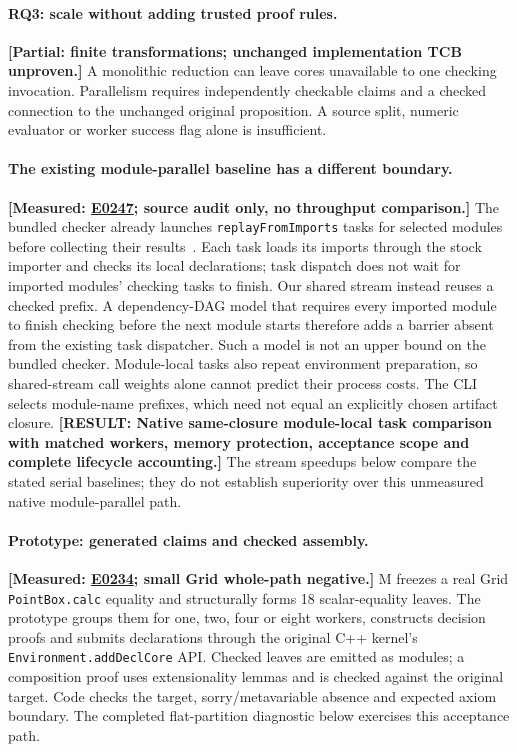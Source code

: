 \documentclass[10pt,twocolumn]{article}
\newcommand{\missing}[1]{\textbf{[RESULT: #1]}}
\newcommand{\measured}[1]{\textbf{[Measured: #1]}}
\newcommand{\partialev}[1]{\textbf{[Partial: #1]}}
\newcommand{\expref}[2]{\href{https://github.com/yunwei37/proofserve/blob/main/docs/tmp/build-and-evaluate/step-#1/step-report.md}{E#2}}
\begin{document}
\paragraph{RQ3: scale without adding trusted proof rules.}
\partialev{finite transformations; unchanged implementation TCB unproven.}
A monolithic reduction can leave cores unavailable to one checking invocation.
Parallelism requires independently checkable claims and a checked connection
to the unchanged original proposition.
A source split, numeric evaluator or worker success flag alone is insufficient.

\paragraph{The existing module-parallel baseline has a different boundary.}
\measured{\expref{0247-20261101T131749+0000}{0247}; source audit only, no throughput comparison.}
The bundled checker already launches \texttt{replayFromImports} tasks for
selected modules before collecting their results~\cite{lean434CheckerSource2026}.
Each task loads its imports through the stock importer and checks its local
declarations; task dispatch does not wait for imported modules' checking
tasks to finish.
Our shared stream instead reuses a checked prefix.
A dependency-DAG model that requires every imported module to finish checking
before the next module starts therefore adds a barrier absent from the
existing task dispatcher.
Such a model is not an upper bound on the bundled checker.
Module-local tasks also repeat environment preparation, so shared-stream
call weights alone cannot predict their process costs.
The CLI selects module-name prefixes, which need not equal an explicitly
chosen artifact closure.
\missing{Native same-closure module-local task comparison with matched workers,
memory protection, acceptance scope and complete lifecycle accounting.}
The stream speedups below compare the stated serial baselines; they do not
establish superiority over this unmeasured native module-parallel path.

\paragraph{Prototype: generated claims and checked assembly.}
\measured{\expref{0234-20261101T030854+0000}{0234}; small Grid whole-path negative.}
M freezes a real Grid \texttt{PointBox.calc} equality and structurally forms
18 scalar-equality leaves.
The prototype groups them for one, two, four or eight workers, constructs
decision proofs and submits declarations through the original C++ kernel's
\texttt{Environment.addDeclCore} API.
Checked leaves are emitted as modules; a composition proof uses
extensionality lemmas and is checked against the original target.
Code checks the target, sorry/metavariable absence and expected axiom boundary.
The completed flat-partition diagnostic below exercises this acceptance path.
\end{document}
